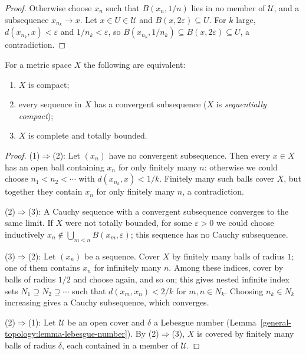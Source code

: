 \begin{proof}
Otherwise choose $x_n$ such that $B(x_n, 1/n)$ lies in no member of $\mathcal{U}$, and a subsequence $x_{n_k} \to x$. Let $x \in U \in \mathcal{U}$ and
$B(x, 2\varepsilon) \subseteq U$. For $k$ large, $d(x_{n_k}, x) < \varepsilon$ and $1/n_k < \varepsilon$, so $B(x_{n_k}, 1/n_k) \subseteq B(x, 2\varepsilon) \subseteq U$,
a contradiction.
\end{proof}

\begin{theorem}\label{general-topology:theorem-compact-metric}
For a metric space $X$ the following are equivalent:
\begin{enumerate}
\item $X$ is compact;
\item every sequence in $X$ has a convergent subsequence ($X$ is \emph{sequentially compact});
\item $X$ is complete and totally bounded.
\end{enumerate}
\end{theorem}

\begin{proof}
(1)$\Rightarrow$(2): Let $(x_n)$ have no convergent subsequence. Then every $x \in X$ has an open ball containing $x_n$ for only finitely many $n$:
otherwise we could choose $n_1 < n_2 < \cdots$ with $d(x_{n_k}, x) < 1/k$. Finitely many such balls cover $X$, but together they contain $x_n$ for only finitely
many $n$, a contradiction.

(2)$\Rightarrow$(3): A Cauchy sequence with a convergent subsequence converges to the same limit. If $X$ were not totally bounded, for some
$\varepsilon > 0$ we could choose inductively $x_n \notin \bigcup_{m < n} B(x_m, \varepsilon)$; this sequence has no Cauchy subsequence.

(3)$\Rightarrow$(2): Let $(x_n)$ be a sequence. Cover $X$ by finitely many balls of radius $1$; one of them contains $x_n$ for infinitely many $n$. Among
these indices, cover by balls of radius $1/2$ and choose again, and so on; this gives nested infinite index sets $N_1 \supseteq N_2 \supseteq \cdots$ such that
$d(x_m, x_n) < 2/k$ for $m, n \in N_k$. Choosing $n_k \in N_k$ increasing gives a Cauchy subsequence, which converges.

(2)$\Rightarrow$(1): Let $\mathcal{U}$ be an open cover and $\delta$ a Lebesgue number (Lemma~\ref{general-topology:lemma-lebesgue-number}). By
(2)$\Rightarrow$(3), $X$ is covered by finitely many balls of radius $\delta$, each contained in a member of $\mathcal{U}$.
\end{proof}

